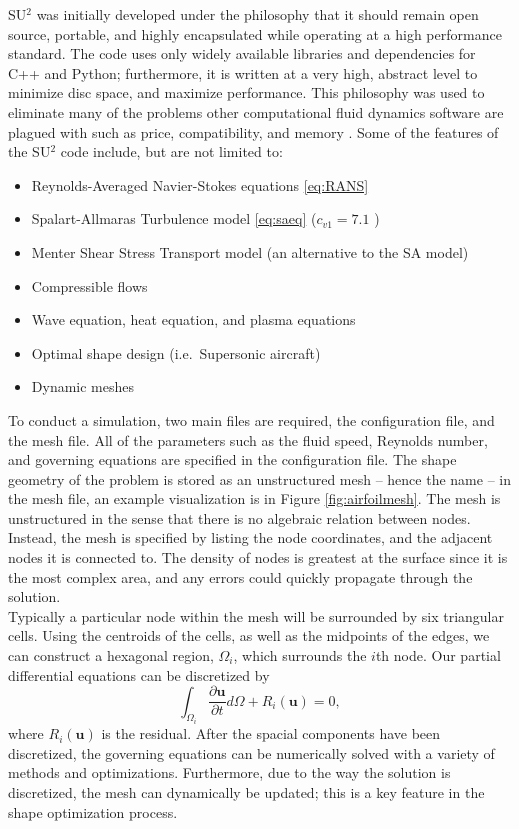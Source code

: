 \documentclass[10pt, titlepage]{article}
\begin{document}
SU$^2$ was initially developed under the philosophy that it should remain open source, portable, and highly encapsulated while operating at a high performance standard. The code uses only widely available libraries and dependencies for C++ and Python; furthermore, it is written at a very high, abstract level to minimize disc space, and maximize performance. This philosophy was used to eliminate many of the problems other computational fluid dynamics software are plagued with such as price, compatibility, and memory  \cite{su2main}. Some of the features of the SU$^2$ code include, but are not limited to:
\begin{itemize}
\item Reynolds-Averaged Navier-Stokes equations \eqref{eq:RANS}
\item Spalart-Allmaras Turbulence model \eqref{eq:saeq} ($c_{v1} = 7.1$ \cite{su2main} \cite{su2two})
\item Menter Shear Stress Transport model (an alternative to the SA model)
\item Compressible flows
\item Wave equation, heat equation, and plasma equations
\item Optimal shape design (i.e.\ Supersonic aircraft)
\item Dynamic meshes \\
\end{itemize}

To conduct a simulation, two main files are required, the configuration file, and the mesh file. All of the parameters such as the fluid speed, Reynolds number, and governing equations are specified in the configuration file. The shape geometry of the problem is stored as an unstructured mesh -- hence the name -- in the mesh file, an example visualization is in Figure \ref{fig:airfoilmesh}. The mesh is unstructured in the sense that there is no algebraic relation between nodes. Instead, the mesh is specified by listing the node coordinates, and the adjacent nodes it is connected to. The density of nodes is greatest at the surface since it is the most complex area, and any errors could quickly propagate through the solution. \\

Typically a particular node within the mesh will be surrounded by six triangular cells. Using the centroids of the cells, as well as the midpoints of the edges, we can construct a hexagonal region, $\Omega_i$, which surrounds the $i$th node. Our partial differential equations can be discretized by 
\begin{equation*}
\int_{\Omega_i} \frac{\partial \mathbf{u}}{\partial t} d\Omega + R_i(\mathbf{u}) = 0,
\end{equation*}
where $R_i(\mathbf{u})$ is the residual. After the spacial components have been discretized, the governing equations can be numerically solved with a variety of methods and optimizations. Furthermore, due to the way the solution is discretized, the mesh can dynamically be updated; this is a key feature in the shape optimization process.
\end{document}
